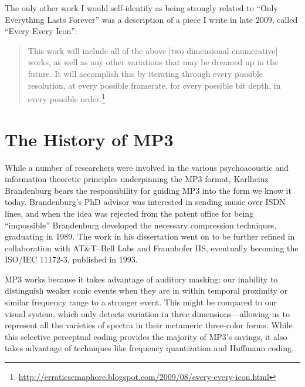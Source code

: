 \documentclass{thesis}
\begin{document}
The only other work I would self-identify as being strongly related to ``Only Everything Lasts Forever'' was a description of a piece I write in late 2009, called ``Every Every Icon'':
	
	\begin{quote}
	This work will include all of the above [two dimensional enumerative] works, as well as any other variations that may be dreamed up in the future. It will accomplish this by iterating through every possible resolution, at every possible framerate, for every possible bit depth, in every possible order.\footnote{\url{http://erraticsemaphore.blogspot.com/2009/08/every-every-icon.html}}
	\end{quote}	

\section{The History of MP3}

While a number of researchers were involved in the various psychoacoustic and information theoretic principles underpinning the MP3 format, Karlheinz Brandenburg bears the responsibility for guiding MP3 into the form we know it today. Brandenburg's PhD advisor was interested in sending music over ISDN lines, and when the idea was rejected from the patent office for being ``impossible'' Brandenburg developed the necessary compression techniques, graduating in 1989\cite{brandenburg_interviews_2004}. The work in his dissertation went on to be further refined in collaboration with AT\&T--Bell Labs and Fraunhofer IIS, eventually becoming the ISO/IEC 11172-3, published in 1993.

MP3 works because it takes advantage of auditory masking: our inability to distinguish weaker sonic events when they are in within temporal proximity or similar frequency range to a stronger event.\cite{Ruckert05} This might be compared to our visual system, which only detects variation in three dimensions---allowing us to represent all the varieties of spectra in their metameric three-color forms. While this selective perceptual coding provides the majority of MP3's savings, it also takes advantage of techniques like frequency quantization and Huffmann coding.
\end{document}
